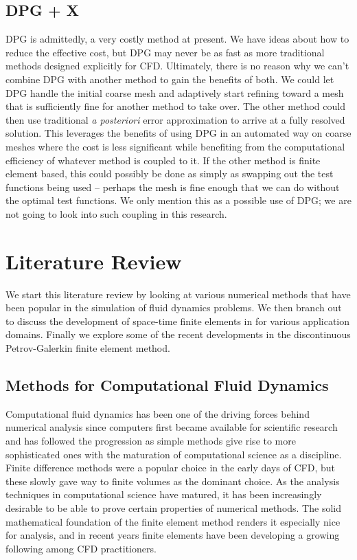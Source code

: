 \documentclass[Dissertation.tex]{subfiles}
\begin{document}
\subsection{DPG + X}
DPG is admittedly, a very costly method at present.
We have ideas about how to reduce the effective cost, but DPG may never be as fast as more traditional methods designed explicitly for CFD.
Ultimately, there is no reason why we can't combine DPG with another method to gain the benefits of both.
We could let DPG handle the initial coarse mesh and adaptively start refining toward a mesh that is sufficiently fine for another method to take over.
The other method could then use traditional \emph{a posteriori} error approximation to arrive at a fully resolved solution.
This leverages the benefits of using DPG in an automated way on coarse meshes where the cost is less significant while benefiting from the
computational efficiency of whatever method is coupled to it.
If the other method is finite element based, this could possibly be done as simply as swapping out the test functions being used
-- perhaps the mesh is fine enough that we can do without the optimal test functions.
We only mention this as a possible use of DPG; we are not going to look into such coupling in this research.

\section{Literature Review}
We start this literature review by looking at various numerical methods that have been popular in the simulation of fluid dynamics problems.
We then branch out to discuss the development of space-time finite elements in for various application domains.
Finally we explore some of the recent developments in the discontinuous Petrov-Galerkin finite element method.

\subsection{Methods for Computational Fluid Dynamics}
Computational fluid dynamics has been one of the driving forces behind numerical analysis since computers first became available for
scientific research and has followed the progression as simple methods give rise to more sophisticated ones with the maturation of computational
science as a discipline.
Finite difference methods were a popular choice in the early days of CFD, but these slowly gave way to finite volumes as the dominant choice.
As the analysis techniques in computational science have matured, it has been increasingly desirable to be able to prove certain properties of
numerical methods.
The solid mathematical foundation of the finite element method renders it especially nice for analysis, and in recent years finite elements have
been developing a growing following among CFD practitioners.
\end{document}
